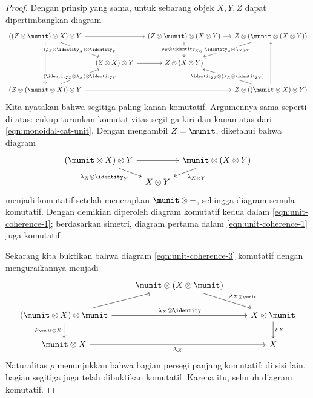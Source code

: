 \begin{proof}
	Dengan prinsip yang sama, untuk sebarang objek $X, Y, Z$ dapat dipertimbangkan diagram
	\begin{equation*}\begin{tikzcd}[column sep=small, row sep=2.25em]
		((Z \otimes \munit) \otimes X) \otimes Y \arrow[dd] \arrow[rr] \arrow[rd, "{(\rho_Z \otimes \identity_X) \otimes \identity_Y}" description] & & (Z \otimes \munit) \otimes (X \otimes Y) \arrow[r] \arrow[d, "{\rho_Z \otimes \identity_{X \otimes Y}}" description] & Z \otimes (\munit \otimes (X \otimes Y)) \arrow[ld, "{\identity_Z \otimes \lambda_{X \otimes Y}}" description] \\
		& (Z \otimes X) \otimes Y \arrow[r] & Z \otimes (X \otimes Y) & \\
		(Z \otimes (\munit \otimes X)) \otimes Y \arrow[rrr] \arrow[ru, "{(\identity_Z \otimes \lambda_X) \otimes \identity_Y}" description] & & & Z \otimes ((\munit \otimes X) \otimes Y) \arrow[uu] \arrow[lu, "{\identity_Z \otimes (\lambda_X \otimes \identity_Y)}" description]
	\end{tikzcd}\end{equation*}
	Kita nyatakan bahwa segitiga paling kanan komutatif. Argumennya sama seperti di atas: cukup turunkan komutativitas segitiga kiri dan kanan atas dari \eqref{eqn:monoidal-cat-unit}. Dengan mengambil $Z = \munit$, diketahui bahwa diagram
	\[ \begin{tikzcd}[column sep=tiny, row sep=small]
		(\munit \otimes X) \otimes Y \arrow[rr] \arrow[rd, "{\lambda_X \otimes \identity_Y}"'] & & \munit \otimes (X \otimes Y) \arrow[ld, "{\lambda_{X \otimes Y}}"] \\
		& X \otimes Y &
	\end{tikzcd} \]
	menjadi komutatif setelah menerapkan $\munit \otimes -$, sehingga diagram semula komutatif. Dengan demikian diperoleh diagram komutatif kedua dalam \eqref{eqn:unit-coherence-1}; berdasarkan simetri, diagram pertama dalam \eqref{eqn:unit-coherence-1} juga komutatif.

	Sekarang kita buktikan bahwa diagram \eqref{eqn:unit-coherence-3} komutatif dengan menguraikannya menjadi
	\[ \begin{tikzcd}
		{} & \munit \otimes (X \otimes \munit) \arrow[rd, "{\lambda_{X \otimes \munit}}"] & \\
		(\munit \otimes X) \otimes \munit \arrow[rr, "{\lambda_X \otimes \identity}"] \arrow[d, "{\rho_{\munit \otimes X}}"'] \arrow[ru] & & X \otimes \munit \arrow[d, "{\rho_X}"] \\
		\munit \otimes X \arrow[rr, "{\lambda_X}"'] & & X
	\end{tikzcd}\]
	Naturalitas $\rho$ menunjukkan bahwa bagian persegi panjang komutatif; di sisi lain, bagian segitiga juga telah dibuktikan komutatif. Karena itu, seluruh diagram komutatif.
\end{proof}

